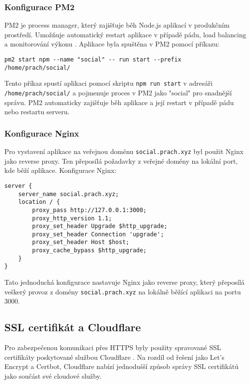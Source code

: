 \documentclass[12pt]{article}
\begin{document}
\subsubsection{Konfigurace PM2}
PM2 je process manager, který zajišťuje běh Node.js aplikací v produkčním prostředí. Umožňuje automatický restart aplikace v případě pádu, load balancing a monitorování výkonu \citep{Bergmann2023}.
Aplikace byla spuštěna v PM2 pomocí příkazu:
\begin{verbatim}
pm2 start npm --name "social" -- run start --prefix /home/prach/social/
\end{verbatim}
Tento příkaz spustí aplikaci pomocí skriptu \texttt{npm run start} v adresáři \texttt{/home/prach/social/} a pojmenuje proces v PM2 jako "social" pro snadnější správu.
PM2 automaticky zajišťuje běh aplikace a její restart v případě pádu nebo restartu serveru.
\subsubsection{Konfigurace Nginx}
Pro vystavení aplikace na veřejnou doménu \texttt{social.prach.xyz} byl použit Nginx jako reverse proxy. Ten přeposílá požadavky z veřejné domény na lokální port, kde běží aplikace.
Konfigurace Nginx:
\begin{verbatim}
server {
    server_name social.prach.xyz;
    location / {
        proxy_pass http://127.0.0.1:3000;
        proxy_http_version 1.1;
        proxy_set_header Upgrade $http_upgrade;
        proxy_set_header Connection 'upgrade';
        proxy_set_header Host $host;
        proxy_cache_bypass $http_upgrade;
    }
}
\end{verbatim}
Tato jednoduchá konfigurace nastavuje Nginx jako reverse proxy, který přeposílá veškerý provoz z domény \texttt{social.prach.xyz} na lokálně běžící aplikaci na portu 3000.
\subsection{SSL certifikát a Cloudflare}
Pro zabezpečenou komunikaci přes HTTPS byly použity spravované SSL certifikáty poskytované službou Cloudflare \citep{Cloudflare2023}. Na rozdíl od řešení jako Let's Encrypt a Certbot, Cloudflare nabízí jednodušší způsob správy SSL certifikátů jako součást své cloudové služby.
\end{document}
